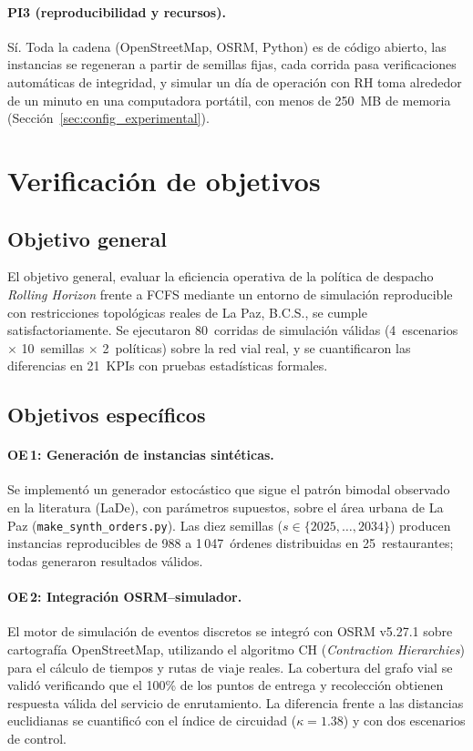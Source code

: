 \documentclass[12pt,letterpaper,oneside]{book}
\begin{document}
	\paragraph{PI3 (reproducibilidad y recursos).}  Sí.  Toda la cadena (OpenStreetMap, OSRM,
	Python) es de código abierto, las instancias se regeneran a partir de semillas fijas, cada
	corrida pasa verificaciones automáticas de integridad, y simular un día de operación con RH
	toma alrededor de un minuto en una computadora portátil, con menos de 250~MB de memoria
	(Sección~\ref{sec:config_experimental}).

	\section{Verificación de objetivos}

	\subsection{Objetivo general}
	El objetivo general, evaluar la eficiencia operativa de la política de despacho
	\emph{Rolling Horizon} frente a FCFS mediante un entorno de simulación reproducible
	con restricciones topológicas reales de La Paz, B.C.S., se cumple
	satisfactoriamente.  Se ejecutaron 80~corridas de simulación válidas (4~escenarios
	$\times$ 10~semillas $\times$ 2~políticas) sobre la red vial real, y se
	cuantificaron las diferencias en 21~KPIs con pruebas estadísticas formales.

	\subsection{Objetivos específicos}

	\paragraph{OE\,1: Generación de instancias sintéticas.}
	Se implementó un generador estocástico que sigue el patrón bimodal observado en la
	literatura (LaDe), con parámetros supuestos, sobre el área urbana de La Paz
	(\texttt{make\_synth\_orders.py}). Las diez semillas ($s \in \{2025, \ldots, 2034\}$)
	producen instancias reproducibles de 988 a 1\,047~órdenes distribuidas en
	25~restaurantes; todas generaron resultados válidos.

	\paragraph{OE\,2: Integración OSRM--simulador.}
	El motor de simulación de eventos discretos se integró con OSRM v5.27.1 sobre
	cartografía OpenStreetMap, utilizando el algoritmo CH (\textit{Contraction Hierarchies})
	para el cálculo de tiempos y rutas de viaje reales.  La cobertura del grafo vial
	se validó verificando que el 100\% de los puntos de entrega y recolección obtienen
	respuesta válida del servicio de enrutamiento.  La diferencia frente a las distancias
	euclidianas se cuantificó con el índice de circuidad ($\kappa = 1{.}38$) y con dos
	escenarios de control.
\end{document}
